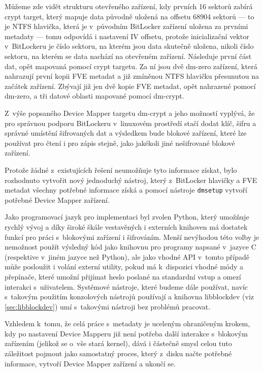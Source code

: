 Můžeme zde vidět strukturu otevřeného zařízení, kdy prvních 16 sektorů zabírá crypt target, který mapuje data původně uložená na offsetu 68904 sektorů --- to je NTFS hlavička, která je v~původním BitLocker zařízení uložena za prvními metadaty --- tomu odpovídá i nastavení IV offsetu, protože inicializační vektor v~BitLockeru je číslo sektoru, na kterém jsou data skutečně uložena, nikoli číslo sektoru, na kterém se data nachází na otevřeném zařízení. Následuje první část dat, opět mapovaná pomocí crypt targetu. Za ní jsou dvě dm-zero zařízení, která nahrazují první kopii FVE metadat a již zmíněnou NTFS hlavičku přesunutou na začátek zařízení. Zbývají již jen dvě kopie FVE metadat, opět nahrazené pomocí dm-zero, a tři datové oblasti mapované pomocí dm-crypt.

\label{sec:implementace-nastroj}

Z~výše popsaného Device Mapper targetu dm-crypt a jeho možností vyplývá, že pro správnou podporu BitLockeru v~linuxovém prostředí stačí dodat klíč, šifru a správné umístění šifrovaných dat a výsledkem bude blokové zařízení, které lze používat pro čtení i pro zápis stejně, jako jakékoli jiné nešifrované blokové zařízení.

Protože žádné z~existujících řešení neumožňuje tyto informace získat, bylo rozhodnuto vytvořit nový jednoduchý nástroj, který z~BitLocker hlavičky a FVE metadat všechny potřebné informace získá a pomocí nástroje \texttt{dmsetup} vytvoří potřebné Device Mapper zařízení.


Jako programovací jazyk pro implementaci byl zvolen Python, který umožňuje rychlý vývoj a díky široké škále vestavěných i externích knihoven má dostatek funkcí pro práci s~blokovými zařízení i šifrováním. Menší nevýhodou této volby je nemožnost použít výsledný kód jako knihovnu pro programy napsané v~jazyce C (respektive v~jiném jazyce než Python), ale jako vhodné API v~tomto případě může posloužit i volání externí utility, pokud má k~dispozici vhodné módy a přepínače, které umožní přijímat heslo poslané na standardní vstup a omezí interakci s~uživatelem. Systémové nástroje, které budeme dále používat, navíc s~takovým použitím konzolových nástrojů používají a knihovna libblockdev (viz \ref{sec:libblockdev}) umí s~takovými nástroji bez problémů pracovat.

Vzhledem k~tomu, že celá práce s~metadaty je uceleným ohraničeným krokem, kdy po nastavení Device Mapperu již není potřeba další interakce s~blokovým zařízením (jelikož se o~vše stará kernel), dává i částečně smysl celou tuto záležitost pojmout jako samostatný proces, který z~disku načte potřebné informace, vytvoří Device Mapper zařízení a ukončí se.

